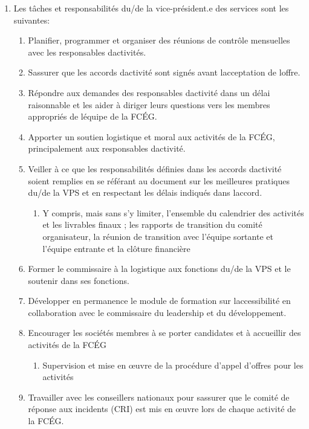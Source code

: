 \begin{enumerate}
 \item
  Les tâches et responsabilités du/de la vice-président.e des services sont les suivantes:
  \begin{enumerate}
   \item
    Planifier, programmer et organiser des réunions de contrôle mensuelles avec les responsables d\textquotesingle activités.
   \item
    S\textquotesingle assurer que les accords d\textquotesingle activité sont signés avant l\textquotesingle acceptation de l\textquotesingle offre.
   \item
    Répondre aux demandes des responsables d\textquotesingle activité dans un délai raisonnable et les aider à diriger leurs questions vers les membres appropriés de l\textquotesingle équipe de la FCÉG.
   \item
    Apporter un soutien logistique et moral aux activités de la FCÉG, principalement aux responsables d\textquotesingle activité.
   \item
    Veiller à ce que les responsabilités définies dans les accords d\textquotesingle activité soient remplies en se référant au document sur les meilleures pratiques du/de la VPS et en respectant les délais indiqués dans l\textquotesingle accord.
    \begin{enumerate}
     \item
      Y compris, mais sans s'y limiter, l'ensemble du calendrier des activités et les livrables finaux ; les rapports de transition du comité organisateur, la réunion de transition avec l'équipe sortante et l'équipe entrante et la clôture financière
    \end{enumerate}
   \item
    Former le commissaire à la logistique aux fonctions du/de la VPS et le soutenir dans ses fonctions.
   \item
    Développer en permanence le module de formation sur l\textquotesingle accessibilité en collaboration avec le commissaire du leadership et du développement.
   \item
    Encourager les sociétés membres à se porter candidates et à accueillir des activités de la FCÉG
    \begin{enumerate}
     \item
      Supervision et mise en œuvre de la procédure d'appel d'offres pour les activités
    \end{enumerate}
   \item
    Travailler avec les conseillers nationaux pour s\textquotesingle assurer que le comité de réponse aux incidents (CRI) est mis en œuvre lors de chaque activité de la FCÉG.
  \end{enumerate}
\end{enumerate}

